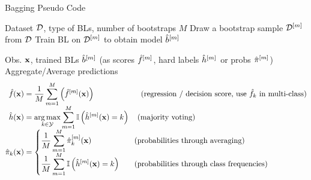 \documentclass[11pt,compress,t,notes=noshow, xcolor=table]{beamer}
\begin{document}
\begin{vbframe}{Bagging Pseudo Code}
\vspace{-2ex}
\begin{algorithm}[H]
  \scriptsize
  \caption*{Bagging algorithm: Training}
  \begin{algorithmic}[1]
     Dataset $\mathcal{D}$, type of BLs, number of bootstraps $M$
      \State Draw a bootstrap sample $\mathcal{D}^{[m]}$ from $\mathcal{D}$
      \State Train BL on $\mathcal{D}^{[m]}$ to obtain model $\hat{b}^{[m]}$
    \EndFor
  \end{algorithmic}
\end{algorithm}
\vspace{-0.7cm}
\begin{algorithm}[H]
  \scriptsize
  \caption*{Bagging algorithm: Prediction}
  \begin{algorithmic}[1]
     Obs. $\mathbf{x}$, trained BLs $\hat{b}^{[m]}$ (as scores $\hat{f}^{[m]}$, hard labels $\hat{h}^{[m]}$ or probs $\hat{\pi}^{[m]}$)
    \State Aggregate/Average predictions
    \vspace{-2ex}
    \begin{align*}
      \hat{f}(\mathbf{x}) &= \frac{1}{M} \sum\limits_{m=1}^M \left(\hat{f}^{[m]}(\mathbf{x})\right) \qquad \qquad \qquad \text{(regression / decision score, use $\hat{f}_k$ in multi-class)} \\[-1ex]
      \hat{h}(\mathbf{x}) &= \operatorname*{arg\,max}_{k \in \mathcal{Y}} \sum\limits_{m=1}^M \mathbb{I} \left(\hat{h}^{[m]}(\mathbf{x}) = k\right) \quad \text{(majority voting)} \\[-1ex]
    \hat \pi_{k}(\mathbf{x}) &=
    \left\{
    \begin{aligned}
    & \frac{1}{M} \sum\limits_{m=1}^M \hat{\pi}_{k}^{[m]}(\mathbf{x}) \quad && \text{(probabilities through averaging)} \\[-1ex]
    & \frac{1}{M} \sum\limits_{m=1}^M \mathbb{I} \left(\hat{h}^{[m]}(\mathbf{x}) = k \right) \quad && \text{(probabilities through class frequencies)}
    \end{aligned}
    \right.
    \end{align*}
    \vspace{-3ex}
  \end{algorithmic}
\end{algorithm}
\vspace{-3ex}
\end{vbframe}
\end{document}
